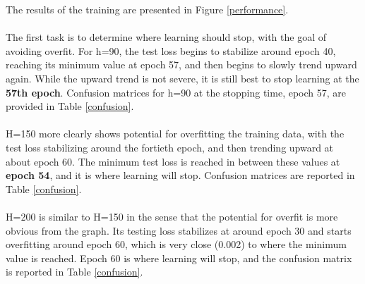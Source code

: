 \documentclass{homework}
\begin{document}
The results of the training are presented in Figure \ref{performance}.\\\\
The first task is to determine where learning should stop, with the goal of avoiding overfit. For h=90, the test loss begins to stabilize around epoch 40, reaching its minimum value at epoch 57, and then begins to slowly trend upward again. While the upward trend is not severe, it is still best to stop learning at the \textbf{57th epoch}. Confusion matrices for h=90 at the stopping time, epoch 57, are provided in Table \ref{confusion}.\\\\
H=150 more clearly shows potential for overfitting the training data, with the test loss stabilizing around the fortieth epoch, and then trending upward at about epoch 60. The minimum test loss is reached in between these values at \textbf{epoch 54}, and it is where learning will stop. Confusion matrices are reported in Table \ref{confusion}.\\\\
H=200 is similar to H=150 in the sense that the potential for overfit is more obvious from the graph. Its testing loss stabilizes at around epoch 30 and starts overfitting around epoch 60, which is very close (0.002) to where the minimum value is reached. Epoch 60 is where learning will stop, and the confusion matrix is reported in Table \ref{confusion}.
\end{document}
